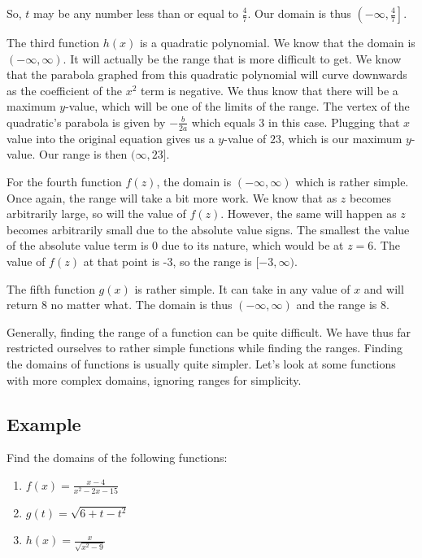 \documentclass[12pt]{article}
\begin{document}
                So, $t$ may be any number less than or equal to $\frac{4}{7}$.
                Our domain is thus $\left(-\infty, \frac{4}{7}\right]$.

The third function $h(x)$ is a quadratic polynomial.
We know that the domain is $(-\infty, \infty)$.
It will actually be the range that is more difficult to get.
We know that the parabola graphed from this quadratic polynomial will curve downwards as the coefficient of the $x^2$ term is negative.
We thus know that there will be a maximum $y$-value, which will be one of the limits of the range.
The vertex of the quadratic's parabola is given by $-\frac{b}{2a}$ which equals $3$ in this case.
Plugging that $x$ value into the original equation gives us a $y$-value of $23$, which is our maximum $y$-value.
Our range is then $(\infty, 23]$.

For the fourth function $f(z)$, the domain is $(-\infty , \infty)$ which is rather simple.
Once again, the range will take a bit more work.
We know that as $z$ becomes arbitrarily large, so will the value of $f(z)$.
However, the same will happen as $z$ becomes arbitrarily small due to the absolute value signs.
The smallest the value of the absolute value term is 0 due to its nature, which would be at $z=6$.
The value of $f(z)$ at that point is -3, so the range is $[-3, \infty)$.

The fifth function $g(x)$ is rather simple.
It can take in any value of $x$ and will return $8$ no matter what.
The domain is thus $(-\infty , \infty)$ and the range is $8$.

Generally, finding the range of a function can be quite difficult.
We have thus far restricted ourselves to rather simple functions while finding the ranges.
Finding the domains of functions is usually quite simpler.
Let's look at some functions with more complex domains, ignoring ranges for simplicity.

\subsection{Example}
Find the domains of the following functions:

\begin{enumerate}
    \item $f(x) = \displaystyle \frac{{x - 4}}{{{x^2} - 2x - 15}}$
    \item $g(t) = \sqrt {6 + t - {t^2}}$
    \item $h(x) = \displaystyle \frac{x}{{\sqrt {{x^2} - 9} }}$
\end{enumerate}
\end{document}
